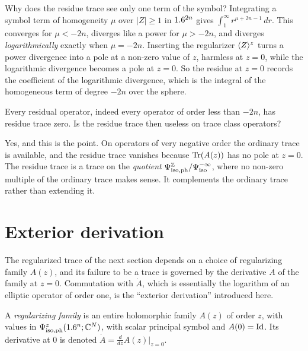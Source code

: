 \begin{discussion}
Why does the residue trace see only one term of the symbol? Integrating a
symbol term of homogeneity $\mu$ over $|Z|\ge1$ in $1.6^{2n}$ gives
$\int_1^\infty r^{\mu+2n-1}\,dr$. This converges for $\mu<-2n$, diverges
like a power for $\mu>-2n$, and diverges \emph{logarithmically} exactly when
$\mu=-2n$. Inserting the regularizer $\langle Z\rangle^z$ turns a power divergence
into a pole at a non-zero value of $z$, harmless at $z=0$, while the
logarithmic divergence becomes a pole at $z=0$. So the residue at $z=0$
records the coefficient of the logarithmic divergence, which is the
integral of the homogeneous term of degree $-2n$ over the sphere.
\end{discussion}

\begin{question}
Every residual operator, indeed every operator of order less than $-2n$, has
residue trace zero. Is the residue trace then useless on trace class
operators?
\end{question}
\begin{answer}
Yes, and this is the point. On operators of very negative order the
ordinary trace is available, and the residue trace vanishes because
$\operatorname{Tr}(A(z))$ has no pole at $z=0$. The residue trace is a trace on the
\emph{quotient} $\Psi^{\mathbb{Z}}_{\mathrm{iso,ph}}/\Psi^{-\infty}_{\mathrm{iso}}$, where no non-zero
multiple of the ordinary trace makes sense. It complements the ordinary
trace rather than extending it.
\end{answer}

\section{Exterior derivation}\label{determinants:sec:derivation}

The regularized trace of the next section depends on a choice of
regularizing family $A(z)$, and its failure to be a trace is governed by the
derivative $\dot A$ of the family at $z=0$. Commutation with $\dot A$, which
is essentially the logarithm of an elliptic operator of order one, is the
``exterior derivation'' introduced here.

\begin{definition}\label{determinants:def:regularizer}
  A \emph{regularizing family} is an entire holomorphic family $A(z)$ of order
  $z$, with values in $\Psi^{z}_{\mathrm{iso,ph}}(1.6^n;\mathbb{C}^N)$, with scalar principal symbol and
  $A(0)=\operatorname{Id}$. Its derivative at $0$ is denoted $\dot A=\frac{d}{dz}A(z)|_{z=0}$.
\end{definition}

